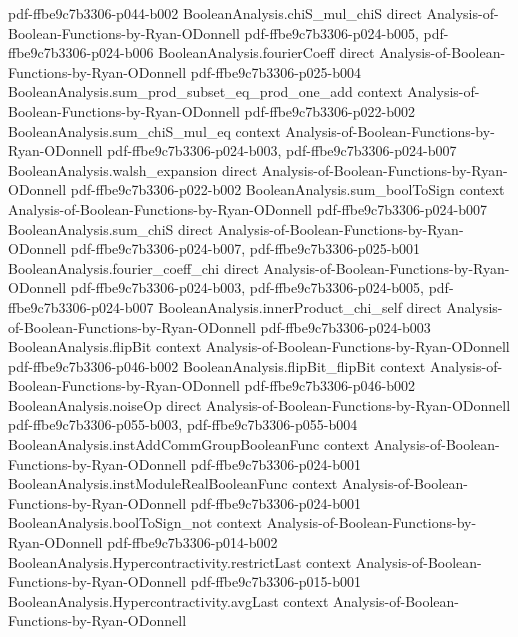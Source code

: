 \begin{theorem}
  {pdf-ffbe9c7b3306-p044-b002}
\proofstep
  {BooleanAnalysis.chiS_mul_chiS}
  {direct}
  {Analysis-of-Boolean-Functions-by-Ryan-ODonnell}
  {pdf-ffbe9c7b3306-p024-b005,
    pdf-ffbe9c7b3306-p024-b006}
\proofstep
  {BooleanAnalysis.fourierCoeff}
  {direct}
  {Analysis-of-Boolean-Functions-by-Ryan-ODonnell}
  {pdf-ffbe9c7b3306-p025-b004}
\proofstep
  {BooleanAnalysis.sum_prod_subset_eq_prod_one_add}
  {context}
  {Analysis-of-Boolean-Functions-by-Ryan-ODonnell}
  {pdf-ffbe9c7b3306-p022-b002}
\proofstep
  {BooleanAnalysis.sum_chiS_mul_eq}
  {context}
  {Analysis-of-Boolean-Functions-by-Ryan-ODonnell}
  {pdf-ffbe9c7b3306-p024-b003,
    pdf-ffbe9c7b3306-p024-b007}
\proofstep
  {BooleanAnalysis.walsh_expansion}
  {direct}
  {Analysis-of-Boolean-Functions-by-Ryan-ODonnell}
  {pdf-ffbe9c7b3306-p022-b002}
\proofstep
  {BooleanAnalysis.sum_boolToSign}
  {context}
  {Analysis-of-Boolean-Functions-by-Ryan-ODonnell}
  {pdf-ffbe9c7b3306-p024-b007}
\proofstep
  {BooleanAnalysis.sum_chiS}
  {direct}
  {Analysis-of-Boolean-Functions-by-Ryan-ODonnell}
  {pdf-ffbe9c7b3306-p024-b007,
    pdf-ffbe9c7b3306-p025-b001}
\proofstep
  {BooleanAnalysis.fourier_coeff_chi}
  {direct}
  {Analysis-of-Boolean-Functions-by-Ryan-ODonnell}
  {pdf-ffbe9c7b3306-p024-b003,
    pdf-ffbe9c7b3306-p024-b005,
    pdf-ffbe9c7b3306-p024-b007}
\proofstep
  {BooleanAnalysis.innerProduct_chi_self}
  {direct}
  {Analysis-of-Boolean-Functions-by-Ryan-ODonnell}
  {pdf-ffbe9c7b3306-p024-b003}
\proofstep
  {BooleanAnalysis.flipBit}
  {context}
  {Analysis-of-Boolean-Functions-by-Ryan-ODonnell}
  {pdf-ffbe9c7b3306-p046-b002}
\proofstep
  {BooleanAnalysis.flipBit_flipBit}
  {context}
  {Analysis-of-Boolean-Functions-by-Ryan-ODonnell}
  {pdf-ffbe9c7b3306-p046-b002}
\proofstep
  {BooleanAnalysis.noiseOp}
  {direct}
  {Analysis-of-Boolean-Functions-by-Ryan-ODonnell}
  {pdf-ffbe9c7b3306-p055-b003,
    pdf-ffbe9c7b3306-p055-b004}
\proofstep
  {BooleanAnalysis.instAddCommGroupBooleanFunc}
  {context}
  {Analysis-of-Boolean-Functions-by-Ryan-ODonnell}
  {pdf-ffbe9c7b3306-p024-b001}
\proofstep
  {BooleanAnalysis.instModuleRealBooleanFunc}
  {context}
  {Analysis-of-Boolean-Functions-by-Ryan-ODonnell}
  {pdf-ffbe9c7b3306-p024-b001}
\proofstep
  {BooleanAnalysis.boolToSign_not}
  {context}
  {Analysis-of-Boolean-Functions-by-Ryan-ODonnell}
  {pdf-ffbe9c7b3306-p014-b002}
\proofstep
  {BooleanAnalysis.Hypercontractivity.restrictLast}
  {context}
  {Analysis-of-Boolean-Functions-by-Ryan-ODonnell}
  {pdf-ffbe9c7b3306-p015-b001}
\proofstep
  {BooleanAnalysis.Hypercontractivity.avgLast}
  {context}
  {Analysis-of-Boolean-Functions-by-Ryan-ODonnell}

\end{theorem}
